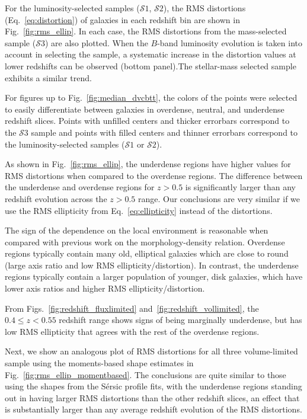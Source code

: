 \documentclass[twocolumn,useAMS,usenatbib]{mn2e}
\newcommand{\arun}[1]{{\textcolor{blue}{#1}}}
\newcommand{\claire}[1]{{\textcolor{magenta}{#1}}}
\newcommand{\sersic}{S\'{e}rsic }
\newcommand{\s}{\ensuremath{\mathcal{S}}}
\begin{document}
For the luminosity-selected samples (\s$1$, \s$2$), the
RMS distortions (Eq.~\ref{eq:distortion}) of galaxies in each redshift bin are shown
in Fig.~\ref{fig:rms_ellip}. In each case, the RMS distortions from the mass-selected sample (\s$3$) are also plotted.
When the $B$-band luminosity evolution is taken into account in selecting the sample, a systematic increase in the distortion values at
lower redshifts can be observed (bottom panel).The stellar-mass selected sample exhibits a similar trend.

For figures up to Fig.~\ref{fig:median_dvcbtt}, the colors of the points were selected to easily differentiate between galaxies in overdense, neutral, and underdense redshift slices.
Points with unfilled centers and thicker errorbars correspond to the \s$3$ sample and points with filled centers and thinner errorbars correspond to the luminosity-selected samples (\s$1$ or \s$2$).

As shown in Fig.~\ref{fig:rms_ellip}, the underdense regions have higher values for RMS distortions when compared to the
overdense regions. The difference between the underdense and overdense
regions for $z>0.5$ is significantly larger than any redshift
evolution across the $z>0.5$ range.  
Our conclusions are very similar if we use the RMS ellipticity from Eq.~\eqref{eq:ellipticity} instead
of the distortions.

The sign of the dependence on the local environment is reasonable when
compared with previous work on the morphology-density
relation. Overdense regions typically contain many old, elliptical
galaxies which are close to round (large axis ratio and low RMS ellipticity/distortion). 
In contrast, the underdense regions typically contain a larger
population of younger, disk galaxies, which have lower axis ratios and
higher RMS ellipticity/distortion.

From Figs.~\ref{fig:redshift_fluxlimited} and~\ref{fig:redshift_vollimited},
the $0.4\le z < 0.55$ redshift range shows signs of being marginally
underdense, but has low RMS ellipticity that agrees with the rest of the overdense regions.

Next, we show an analogous plot of RMS distortions %
for all three
volume-limited sample using the moments-based shape estimates in
Fig.~\ref{fig:rms_ellip_momentbased}. The conclusions are quite
similar to those using the shapes from the \sersic profile fits, with
the underdense regions standing out in having larger RMS distortions 
than the other redshift slices, an effect that is substantially larger
than any average redshift evolution of the RMS distortions.
\end{document}
